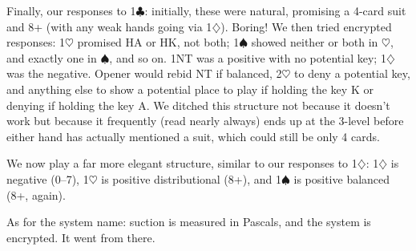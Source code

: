 \documentclass[a4paper,14pt]{extarticle}
\newcommand{\newevenside}{
	\ifthenelse{\isodd{\thepage}}{\newpage}{
	\newpage
	\textcolor{white}{placeholder} 
	\thispagestyle{empty}
	\newpage
	}
}
\begin{document}
Finally, our responses to 1$\clubsuit$: initially, these were natural, promising a 4-card
suit and 8+ (with any weak hands going via 1$\diamondsuit$).  Boring!  We then tried
encrypted responses: 1$\heartsuit$ promised HA or HK, not both; 1$\spadesuit$ showed neither or both
in $\heartsuit$, and exactly one in $\spadesuit$, and so on.  1NT was a positive with no potential
key; 1$\diamondsuit$ was the negative.  Opener would rebid NT if balanced, 2$\heartsuit$ to deny a
potential key, and anything else to show a potential place to play if holding
the key K or denying if holding the key A.  We ditched this structure not
because it doesn't work but because it frequently (read nearly always) ends up
at the 3-level before either hand has actually mentioned a suit, which could
still be only 4 cards.

We now play a far more elegant structure, similar to our responses to 1$\diamondsuit$: 1$\diamondsuit$ is
negative (0--7), 1$\heartsuit$ is positive distributional (8+), and 1$\spadesuit$ is positive balanced
(8+, again).

As for the system name: suction is measured in Pascals, and the system is
encrypted.  It went from there.

\newevenside

\def\thesection{\Alph{section}}
\setcounter{section}{0}

\small

\end{document}

